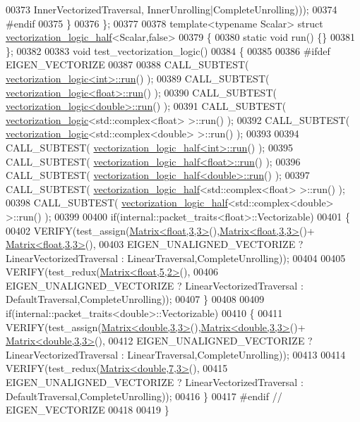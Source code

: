 \begin{DoxyCode}
00373                         InnerVectorizedTraversal, InnerUnrolling|CompleteUnrolling)));
00374 \textcolor{preprocessor}{    #endif}
00375   \}
00376 \};
00377 
00378 \textcolor{keyword}{template}<\textcolor{keyword}{typename} Scalar> \textcolor{keyword}{struct }\hyperlink{structvectorization__logic__half}{vectorization\_logic\_half}<Scalar,false>
00379 \{
00380   \textcolor{keyword}{static} \textcolor{keywordtype}{void} run() \{\}
00381 \};
00382 
00383 \textcolor{keywordtype}{void} test\_vectorization\_logic()
00384 \{
00385 
00386 \textcolor{preprocessor}{#ifdef EIGEN\_VECTORIZE}
00387 
00388   CALL\_SUBTEST( \hyperlink{structvectorization__logic}{vectorization\_logic<int>::run}() );
00389   CALL\_SUBTEST( \hyperlink{structvectorization__logic}{vectorization\_logic<float>::run}() );
00390   CALL\_SUBTEST( \hyperlink{structvectorization__logic}{vectorization\_logic<double>::run}() );
00391   CALL\_SUBTEST( \hyperlink{structvectorization__logic}{vectorization\_logic}<std::complex<float> >::run() );
00392   CALL\_SUBTEST( \hyperlink{structvectorization__logic}{vectorization\_logic}<std::complex<double> >::run() );
00393   
00394   CALL\_SUBTEST( \hyperlink{structvectorization__logic__half}{vectorization\_logic\_half<int>::run}() );
00395   CALL\_SUBTEST( \hyperlink{structvectorization__logic__half}{vectorization\_logic\_half<float>::run}() );
00396   CALL\_SUBTEST( \hyperlink{structvectorization__logic__half}{vectorization\_logic\_half<double>::run}() );
00397   CALL\_SUBTEST( \hyperlink{structvectorization__logic__half}{vectorization\_logic\_half}<std::complex<float> >::run() );
00398   CALL\_SUBTEST( \hyperlink{structvectorization__logic__half}{vectorization\_logic\_half}<std::complex<double> >::run() );
00399   
00400   \textcolor{keywordflow}{if}(internal::packet\_traits<float>::Vectorizable)
00401   \{
00402     VERIFY(test\_assign(\hyperlink{group___core___module_class_eigen_1_1_matrix}{Matrix<float,3,3>}(),\hyperlink{group___core___module_class_eigen_1_1_matrix}{Matrix<float,3,3>}()+
      \hyperlink{group___core___module_class_eigen_1_1_matrix}{Matrix<float,3,3>}(),
00403       EIGEN\_UNALIGNED\_VECTORIZE ? LinearVectorizedTraversal : LinearTraversal,CompleteUnrolling));
00404       
00405     VERIFY(test\_redux(\hyperlink{group___core___module_class_eigen_1_1_matrix}{Matrix<float,5,2>}(),
00406       EIGEN\_UNALIGNED\_VECTORIZE ? LinearVectorizedTraversal : DefaultTraversal,CompleteUnrolling));
00407   \}
00408   
00409   \textcolor{keywordflow}{if}(internal::packet\_traits<double>::Vectorizable)
00410   \{
00411     VERIFY(test\_assign(\hyperlink{group___core___module_class_eigen_1_1_matrix}{Matrix<double,3,3>}(),\hyperlink{group___core___module_class_eigen_1_1_matrix}{Matrix<double,3,3>}()+
      \hyperlink{group___core___module_class_eigen_1_1_matrix}{Matrix<double,3,3>}(),
00412       EIGEN\_UNALIGNED\_VECTORIZE ? LinearVectorizedTraversal : LinearTraversal,CompleteUnrolling));
00413     
00414     VERIFY(test\_redux(\hyperlink{group___core___module_class_eigen_1_1_matrix}{Matrix<double,7,3>}(),
00415       EIGEN\_UNALIGNED\_VECTORIZE ? LinearVectorizedTraversal : DefaultTraversal,CompleteUnrolling));
00416   \}
00417 \textcolor{preprocessor}{#endif // EIGEN\_VECTORIZE}
00418 
00419 \}
\end{DoxyCode}
